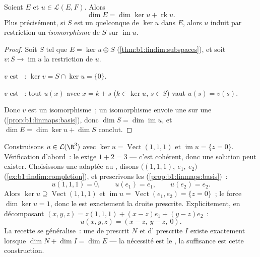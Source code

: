 \begin{theorem}\label{thm:b1:linmaps:ranknullity}
Soient $E$  et $u \in \mathcal{L}(E, F)$.
Alors
\[
\dim E = \dim \ker u + \operatorname{rk} u .
\]
Plus précisément, si $S$ est un  quelconque de $\ker u$ dans
$E$, alors $u$ induit par restriction un \emph{isomorphisme} de $S$ sur
$\operatorname{im} u$.
\end{theorem}

\begin{proof}
Soit $S$ tel que $E = \ker u \oplus S$
(\cref{thm:b1:findim:subspaces}), et soit $v \colon S \to
\operatorname{im} u$ la restriction de $u$.

$v$ est ~: $\ker v = S \cap \ker u = \{0\}$.

$v$ est ~: tout $u(x)$ avec $x = k + s$ ($k \in \ker u$, $s
\in S$) vaut $u(s) = v(s)$.

Donc $v$ est un isomorphisme~; un isomorphisme envoie une  sur une 
(\cref{prop:b1:linmaps:basis}), donc $\dim S = \dim\operatorname{im}
u$, et $\dim E = \dim\ker u + \dim S$ conclut.
\end{proof}

\begin{example}
\label{ex:b1:linmaps:tospec}
Construisons $u \in \mathcal{L}(\R^3)$ avec $\ker u =
\operatorname{Vect}(1,1,1)$ et $\operatorname{im} u = \{z =
0\}$. Vérification d'abord~: le  exige $1 + 2 = 3$ ---
c'est cohérent, donc une solution peut exister. Choisissons une  adaptée
au , disons $\bigl((1,1,1),\ e_1,\ e_2\bigr)$
(\cref{ex:b1:findim:completion}), et prescrivons les 
(\cref{prop:b1:linmaps:basis})~:
\[
u(1,1,1) = 0, \qquad u(e_1) = e_1, \qquad u(e_2) = e_2 .
\]
Alors $\ker u \supseteq \operatorname{Vect}(1,1,1)$ et
$\operatorname{im} u = \operatorname{Vect}(e_1, e_2) = \{z =
0\}$~; le  force $\dim\ker u = 1$, donc le  est
exactement la droite prescrite. Explicitement, en décomposant $(x, y, z)
= z(1,1,1) + (x - z)e_1 + (y - z)e_2$~:
\[
u(x, y, z) = (x - z,\ y - z,\ 0).
\]
La recette se généralise~: une  de  prescrit $N$
et d' prescrite $I$ existe exactement lorsque $\dim N + \dim I = \dim E$
--- la nécessité est le , la suffisance est cette
construction.
\end{example}

